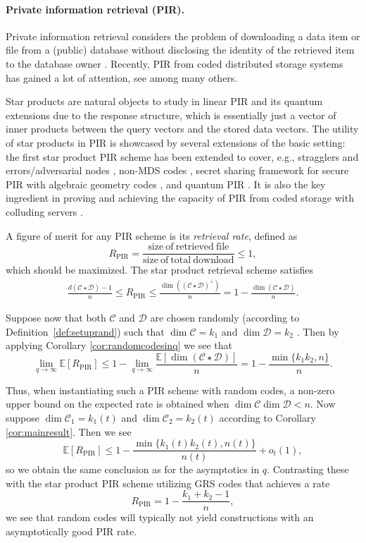 \documentclass[a4paper,11pt,reqno]{article}
\newcommand{\C}{\mathcal{C}}
\newcommand{\D}{\mathcal{D}}
\theoremstyle{plain} \numberwithin{equation}{section}
\theoremstyle{definition}
\begin{document}
\paragraph{Private information retrieval (PIR).}
Private information retrieval considers the problem of downloading a data item or file from a (public) database without disclosing the identity of the retrieved item to the database owner \cite{chor1995private}. Recently, PIR from coded distributed storage systems has gained a lot of attention, see  \cite{Sun2016,Banawan2018,PIR2017,skoglund2019pir} among many others. 

Star products are natural objects to study in linear  PIR and its quantum extensions due to the response structure, which is essentially just a vector of inner products between the query vectors and the stored data vectors. The utility of star products in PIR is showcased by several extensions of the basic setting:  the first star product PIR scheme \cite{PIR2017} has been extended to cover, e.g., stragglers and errors/adversarial nodes \cite{Tajeddine2018ByzStar}, non-MDS codes \cite{tPIR}, secret sharing framework for secure PIR with algebraic geometry codes \cite{makkonen2024secretsharingsecureprivate}, and quantum PIR \cite{allaix2020quantum}. It is also the key ingredient in proving and achieving the capacity of PIR from coded storage with colluding servers \cite{Holzbaur2019starcapa,holzbaur2022tit}. 

A figure of merit for any PIR scheme is its \emph{retrieval rate}, defined as 
$$R_{\mathrm{PIR}}=\frac{\mathrm{size\ of\ retrieved\ file}}{\mathrm{size\ of\ total\ download}}\leq 1,$$ which should be maximized. The star product retrieval scheme \cite{PIR2017} satisfies
\begin{align*}
   \frac{d(\C\star \D)-1}{n} \leq R_{\mathrm{PIR}} \leq \frac{ \dim ((\C\star \D)^\perp)}{n} = 1- \frac{\dim (\C \star \D)}{n}. \label{eq:pirrate}
\end{align*}

Suppose now that both $\C$ and $\D$ are chosen randomly (according to Definition~\ref{def:setuprand}) such that $\dim \C = k_1$ and $\dim \D = k_2$ . Then by applying Corollary \ref{cor:randomcodesinq} we see that
\[
    \lim_{q\rightarrow \infty} \mathbb{E}[R_{\mathrm{PIR}}] \leq 1 - \lim_{q\rightarrow \infty}\frac{ \mathbb{E}[\dim( \C \star \D)]}{n} = 1- \frac{\min\{k_1 k_2,n\}}{n}.
\]

Thus, when instantiating such a PIR scheme with random codes, a non-zero upper bound on the expected rate is obtained when $\dim \C \dim \D < n$. 
Now suppose $\dim \C_1 = k_1(t)$ and $\dim \C_2 = k_2(t)$ according to Corollary \ref{cor:mainresult}. Then we see
\[
    \mathbb{E}[R_{\mathrm{PIR}}] \leq 1 - \frac{\min\{k_1(t)k_2(t),n(t)\}}{n(t)} + o_t(1),
\]
so we obtain the same conclusion as for the asymptotics in $q$. Contrasting these with the star product PIR scheme utilizing GRS codes \cite{PIR2017} that achieves a rate 
$$
R_{\mathrm{PIR}}=1-\frac{k_1+k_2-1}{n},
$$
we see that random codes will typically not yield constructions with an asymptotically good PIR rate. 
\end{document}
